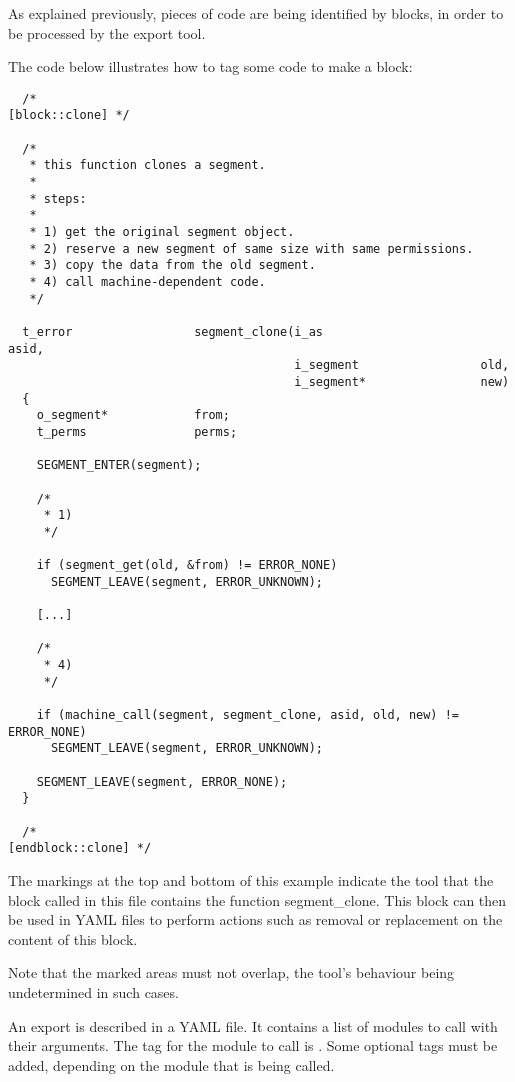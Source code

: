 

As explained previously, pieces of code are being identified by blocks, in
order to be processed by the export tool.

The code below illustrates how to tag some code to make a block:

\begin{verbatim}
  /*                                                          [block::clone] */

  /*
   * this function clones a segment.
   *
   * steps:
   *
   * 1) get the original segment object.
   * 2) reserve a new segment of same size with same permissions.
   * 3) copy the data from the old segment.
   * 4) call machine-dependent code.
   */

  t_error                 segment_clone(i_as                      asid,
                                        i_segment                 old,
                                        i_segment*                new)
  {
    o_segment*            from;
    t_perms               perms;

    SEGMENT_ENTER(segment);

    /*
     * 1)
     */

    if (segment_get(old, &from) != ERROR_NONE)
      SEGMENT_LEAVE(segment, ERROR_UNKNOWN);

    [...]

    /*
     * 4)
     */

    if (machine_call(segment, segment_clone, asid, old, new) != ERROR_NONE)
      SEGMENT_LEAVE(segment, ERROR_UNKNOWN);

    SEGMENT_LEAVE(segment, ERROR_NONE);
  }

  /*                                                       [endblock::clone] */
\end{verbatim}

The markings at the top  and bottom  of this
example indicate the  tool that the block called  in this file
contains the function segment\_clone. This block can then be used in YAML files to perform
actions such as removal or replacement on the content of this block.

Note that the marked areas must not overlap, the  tool's
behaviour being undetermined in such cases.

An export is described in a YAML file. It contains a list of modules to call with their arguments. The tag for the module to call is . Some optional tags must be added, depending on the module that is being called.

